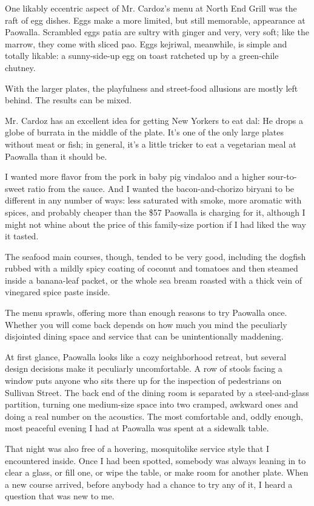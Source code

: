 One likably eccentric aspect of Mr. Cardoz's menu at North End Grill was
the raft of egg dishes. Eggs make a more limited, but still memorable,
appearance at Paowalla. Scrambled eggs patia are sultry with ginger and
very, very soft; like the marrow, they come with sliced pao. Eggs
kejriwal, meanwhile, is simple and totally likable: a sunny-side-up egg
on toast ratcheted up by a green-chile chutney.

With the larger plates, the playfulness and street-food allusions are
mostly left behind. The results can be mixed.

Mr. Cardoz has an excellent idea for getting New Yorkers to eat dal: He
drops a globe of burrata in the middle of the plate. It's one of the
only large plates without meat or fish; in general, it's a little
tricker to eat a vegetarian meal at Paowalla than it should be.

I wanted more flavor from the pork in baby pig vindaloo and a higher
sour-to-sweet ratio from the sauce. And I wanted the bacon-and-chorizo
biryani to be different in any number of ways: less saturated with
smoke, more aromatic with spices, and probably cheaper than the \$57
Paowalla is charging for it, although I might not whine about the price
of this family-size portion if I had liked the way it tasted.

The seafood main courses, though, tended to be very good, including the
dogfish rubbed with a mildly spicy coating of coconut and tomatoes and
then steamed inside a banana-leaf packet, or the whole sea bream roasted
with a thick vein of vinegared spice paste inside.

The menu sprawls, offering more than enough reasons to try Paowalla
once. Whether you will come back depends on how much you mind the
peculiarly disjointed dining space and service that can be
unintentionally maddening.

At first glance, Paowalla looks like a cozy neighborhood retreat, but
several design decisions make it peculiarly uncomfortable. A row of
stools facing a window puts anyone who sits there up for the inspection
of pedestrians on Sullivan Street. The back end of the dining room is
separated by a steel-and-glass partition, turning one medium-size space
into two cramped, awkward ones and doing a real number on the acoustics.
The most comfortable and, oddly enough, most peaceful evening I had at
Paowalla was spent at a sidewalk table.

That night was also free of a hovering, mosquitolike service style that
I encountered inside. Once I had been spotted, somebody was always
leaning in to clear a glass, or fill one, or wipe the table, or make
room for another plate. When a new course arrived, before anybody had a
chance to try any of it, I heard a question that was new to me.

